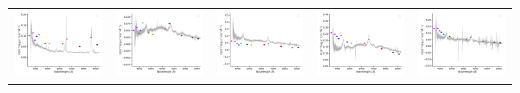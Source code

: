\begin{center}
\begin{longtable}{l l l l l }
    \includegraphics[width=0.19\linewidth, clip]{Figs/Figs-sdss/spec-9238-58013-0137-SPLUS-s02s09-056401.pdf} & \includegraphics[width=0.19\linewidth, clip]{Figs/Figs-sdss/spec-9239-58018-0729-STRIPE82-0136-042690.pdf} & \includegraphics[width=0.19\linewidth, clip]{Figs/Figs-sdss/spec-9383-58097-0530-STRIPE82-0047-031879.pdf} & \includegraphics[width=0.19\linewidth, clip]{Figs/Figs-sdss/spec-9403-58018-0690-STRIPE82-0002-034805.pdf} & \includegraphics[width=0.19\linewidth, clip]{Figs/Figs-sdss/spec-9405-58048-0414-STRIPE82-0009-022679.pdf} \\

\end{longtable}
\end{center}

